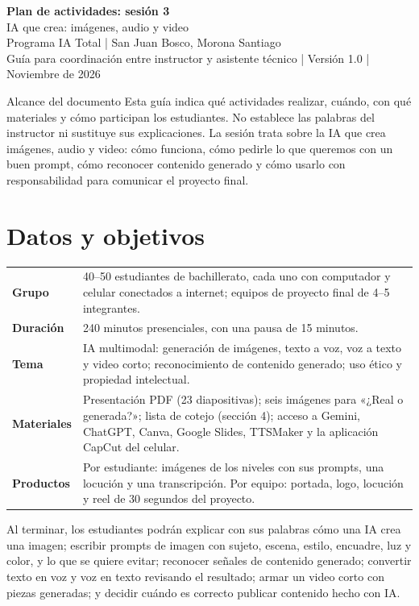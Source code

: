 \documentclass[11pt,a4paper]{article}
\begin{document}
\begin{center}
{\Huge\sffamily\bfseries Plan de actividades: sesión 3}\\[6pt]
{\Large IA que crea: imágenes, audio y video}\\[5pt]
{\large Programa IA Total | San Juan Bosco, Morona Santiago}\\[8pt]
{\small Guía para coordinación entre instructor y asistente técnico | Versión 1.0 | Noviembre de 2026}
\end{center}
\begin{actividad}{Alcance del documento}
Esta guía indica qué actividades realizar, cuándo, con qué materiales y cómo participan los estudiantes. No establece las palabras del instructor ni sustituye sus explicaciones. La sesión trata sobre la IA que crea imágenes, audio y video: cómo funciona, cómo pedirle lo que queremos con un buen prompt, cómo reconocer contenido generado y cómo usarlo con responsabilidad para comunicar el proyecto final.
\end{actividad}

\section{Datos y objetivos}
\noindent\begin{tabularx}{\textwidth}{@{}p{3.3cm}X@{}}\toprule
\textbf{Grupo} & 40--50 estudiantes de bachillerato, cada uno con computador y celular conectados a internet; equipos de proyecto final de 4--5 integrantes.\\
\textbf{Duración} & 240 minutos presenciales, con una pausa de 15 minutos.\\
\textbf{Tema} & IA multimodal: generación de imágenes, texto a voz, voz a texto y video corto; reconocimiento de contenido generado; uso ético y propiedad intelectual.\\
\textbf{Materiales} & Presentación PDF (23 diapositivas); seis imágenes para «¿Real o generada?»; lista de cotejo (sección 4); acceso a Gemini, ChatGPT, Canva, Google Slides, TTSMaker y la aplicación CapCut del celular.\\
\textbf{Productos} & Por estudiante: imágenes de los niveles con sus prompts, una locución y una transcripción. Por equipo: portada, logo, locución y reel de 30 segundos del proyecto.\\\bottomrule
\end{tabularx}

\medskip
Al terminar, los estudiantes podrán explicar con sus palabras cómo una IA crea una imagen; escribir prompts de imagen con sujeto, escena, estilo, encuadre, luz y color, y lo que se quiere evitar; reconocer señales de contenido generado; convertir texto en voz y voz en texto revisando el resultado; armar un video corto con piezas generadas; y decidir cuándo es correcto publicar contenido hecho con IA.
\end{document}

